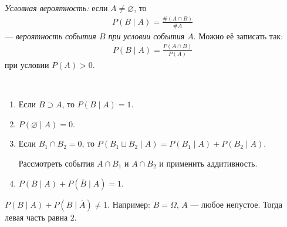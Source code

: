 \begin{df}
 \textit{Условная вероятность:} если $A \neq \varnothing$, то
 \begin{align*}
  P(B \mid A) = \frac{\# (A \cap B)}{\# A}
 \end{align*} --- \textit{вероятность события $B$ при условии события $A$}. Можно её записать так:
 \begin{align*}
  P(B \mid A) = \frac{P(A \cap B)}{P(A)}
 \end{align*} при условии $P(A) > 0$.
\end{df}
\begin{prop*}\
 \begin{enumerate}
  \item Если $B \supset A$, то $P(B \mid A) = 1$.
  \item $P(\varnothing \mid A) = 0$.
  \item Если $B_1 \cap B_2 = 0$, то $P(B_1 \sqcup B_2 \mid A) = P(B_1 \mid A) + P(B_2 \mid A) $.

   Рассмотреть события $A \cap B_1$ и $A \cap B_2$ и применить аддитивность.
  \item $P(B \mid A) + P(\overline B \mid A) = 1$.
 \end{enumerate} 
 \begin{remrk*}
  $P(B \mid A) + P(B \mid \overline A) \neq 1$. Например: $B = \Omega$, $A$ --- любое непустое. Тогда левая часть равна $2$.
 \end{remrk*}
\end{prop*}

